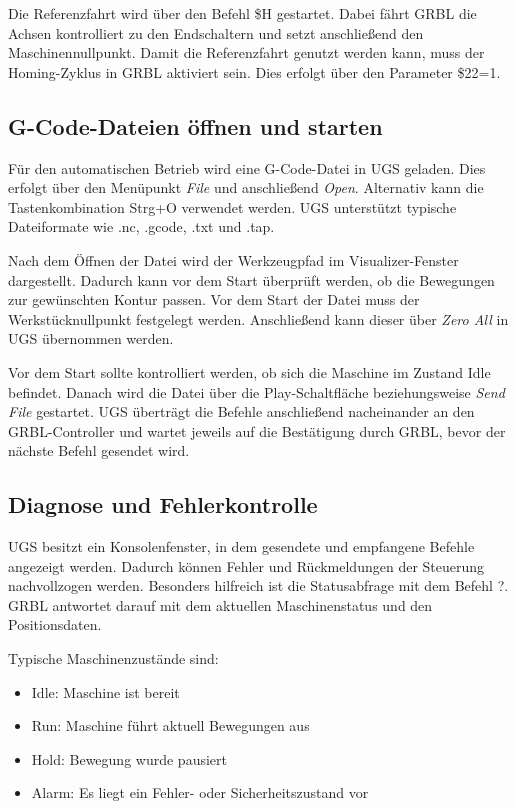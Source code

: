 Die Referenzfahrt wird über den Befehl \$H gestartet. Dabei fährt GRBL die Achsen kontrolliert zu den Endschaltern und setzt anschließend den Maschinennullpunkt. Damit die Referenzfahrt genutzt werden kann, muss der Homing-Zyklus in GRBL aktiviert sein. Dies erfolgt über den Parameter \$22=1.

\subsection{G-Code-Dateien öffnen und starten}

Für den automatischen Betrieb wird eine G-Code-Datei in UGS geladen. Dies erfolgt über den Menüpunkt \textit{File} und anschließend \textit{Open}. Alternativ kann die Tastenkombination Strg+O verwendet werden. UGS unterstützt typische Dateiformate wie .nc, .gcode, .txt und .tap.

Nach dem Öffnen der Datei wird der Werkzeugpfad im Visualizer-Fenster dargestellt. Dadurch kann vor dem Start überprüft werden, ob die Bewegungen zur gewünschten Kontur passen. Vor dem Start der Datei muss der Werkstücknullpunkt festgelegt werden. Anschließend kann dieser über \textit{Zero All} in UGS übernommen werden.

Vor dem Start sollte kontrolliert werden, ob sich die Maschine im Zustand Idle befindet. Danach wird die Datei über die Play-Schaltfläche beziehungsweise \textit{Send File} gestartet. UGS überträgt die Befehle anschließend nacheinander an den GRBL-Controller und wartet jeweils auf die Bestätigung durch GRBL, bevor der nächste Befehl gesendet wird.

\subsection{Diagnose und Fehlerkontrolle}

UGS besitzt ein Konsolenfenster, in dem gesendete und empfangene Befehle angezeigt werden. Dadurch können Fehler und Rückmeldungen der Steuerung nachvollzogen werden. Besonders hilfreich ist die Statusabfrage mit dem Befehl ?. GRBL antwortet darauf mit dem aktuellen Maschinenstatus und den Positionsdaten.

Typische Maschinenzustände sind:

\begin{itemize}
	\item Idle: Maschine ist bereit
	\item Run: Maschine führt aktuell Bewegungen aus
	\item Hold: Bewegung wurde pausiert
	\item Alarm: Es liegt ein Fehler- oder Sicherheitszustand vor
\end{itemize}

